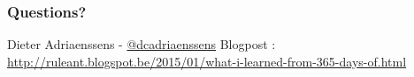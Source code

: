\documentclass[14pt]{beamer}
\begin{document}
  \begin{frame}
   \frametitle{Questions?}
    Dieter Adriaenssens - \href{https://twitter.com/dcadriaenssens}{\small{@dcadriaenssens}}
    \vfill
    Blogpost : \href{http://ruleant.blogspot.be/2015/01/what-i-learned-from-365-days-of.html}{http://ruleant.blogspot.be/2015/01/what-i-learned-from-365-days-of.html}
  \end{frame}
\end{document}
